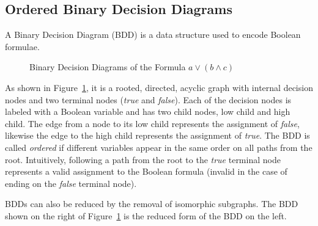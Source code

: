 \subsection{Ordered Binary Decision Diagrams}
A Binary Decision Diagram (BDD) is a data structure used to encode Boolean formulae.
\begin{figure}[!htb]
        \caption{\label{fig:bdd} Binary Decision Diagrams of the Formula $a \lor (b \land c)$}
\end{figure}
As shown in Figure~\ref{fig:bdd}, it is a rooted, directed, acyclic graph with internal decision nodes and two terminal nodes (\textit{true} and \textit{false}). Each of the decision nodes is labeled with a Boolean variable and has two child nodes, low child and high child. The edge from a node to its low child represents the assignment of \textit{false}, likewise the edge to the high child represents the assignment of \textit{true}. The BDD is called \textit{ordered} if different variables appear in the same order on all paths from the root. Intuitively, following a path from the root to the \textit{true} terminal node represents a valid assignment to the Boolean formula (invalid in the case of ending on the \textit{false} terminal node). 

BDDs can also be reduced by the removal of isomorphic subgraphs. The BDD shown on the right of Figure~\ref{fig:bdd} is the reduced form of the BDD on the left. 











